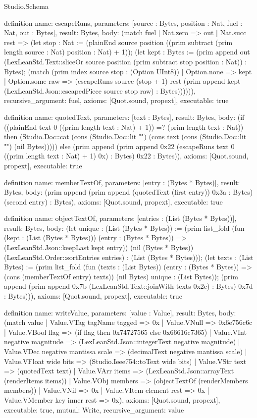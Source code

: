 \begin{lexlean}{Studio.Schema}
\begin{semanticmodule}
definition{
  name: escapeRuns,
  parameters: [source : Bytes, position : Nat, fuel : Nat, out : Bytes],
  result: Bytes,
  body: (match fuel
    | Nat.zero => out
    | Nat.succ rest => (let stop : Nat := (plainEnd source position ((prim subtract (prim length source : Nat) position : Nat) + 1)); (let kept : Bytes := (prim append out (LexLeanStd.Text::sliceOr source position (prim subtract stop position : Nat)) : Bytes); (match (prim index source stop : (Option UInt8))
      | Option.none => kept
      | Option.some raw => (escapeRuns source (stop + 1) rest (prim append kept (LexLeanStd.Json::escapedPiece source stop raw) : Bytes)))))),
  recursive_argument: fuel,
  axioms: [Quot.sound, propext],
  executable: true
}

definition{
  name: quotedText,
  parameters: [text : Bytes],
  result: Bytes,
  body: (if ((plainEnd text 0 ((prim length text : Nat) + 1)) =? (prim length text : Nat)) then (Studio.Doc::cat (cons (Studio.Doc::lit "\"") (cons text (cons (Studio.Doc::lit "\"") (nil Bytes))))) else (prim append (prim append 0x22 (escapeRuns text 0 ((prim length text : Nat) + 1) 0x) : Bytes) 0x22 : Bytes)),
  axioms: [Quot.sound, propext],
  executable: true
}

definition{
  name: memberTextOf,
  parameters: [entry : (Bytes * Bytes)],
  result: Bytes,
  body: (prim append (prim append (quotedText (first entry)) 0x3a : Bytes) (second entry) : Bytes),
  axioms: [Quot.sound, propext],
  executable: true
}

definition{
  name: objectTextOf,
  parameters: [entries : (List (Bytes * Bytes))],
  result: Bytes,
  body: (let unique : (List (Bytes * Bytes)) := (prim list_fold (fun (kept : (List (Bytes * Bytes))) (entry : (Bytes * Bytes)) => (LexLeanStd.Json::keepLast kept entry)) (nil (Bytes * Bytes)) (LexLeanStd.Order::sortEntries entries) : (List (Bytes * Bytes))); (let texts : (List Bytes) := (prim list_fold (fun (texts : (List Bytes)) (entry : (Bytes * Bytes)) => (cons (memberTextOf entry) texts)) (nil Bytes) unique : (List Bytes)); (prim append (prim append 0x7b (LexLeanStd.Text::joinWith texts 0x2c) : Bytes) 0x7d : Bytes))),
  axioms: [Quot.sound, propext],
  executable: true
}

definition{
  name: writeValue,
  parameters: [value : Value],
  result: Bytes,
  body: (match value
    | Value.VTag tagName tagged => 0x
    | Value.VNull => 0x6e756c6c
    | Value.VBool flag => (if flag then 0x74727565 else 0x66616c7365)
    | Value.VInt negative magnitude => (LexLeanStd.Json::integerText negative magnitude)
    | Value.VDec negative mantissa scale => (decimalText negative mantissa scale)
    | Value.VFloat wide bits => (Studio.Ieee754::toText wide bits)
    | Value.VStr text => (quotedText text)
    | Value.VArr items => (LexLeanStd.Json::arrayText (renderItems items))
    | Value.VObj members => (objectTextOf (renderMembers members))
    | Value.VNil => 0x
    | Value.VItem element rest => 0x
    | Value.VMember key inner rest => 0x),
  axioms: [Quot.sound, propext],
  executable: true,
  mutual: Write,
  recursive_argument: value
}


\end{semanticmodule}
\end{lexlean}
